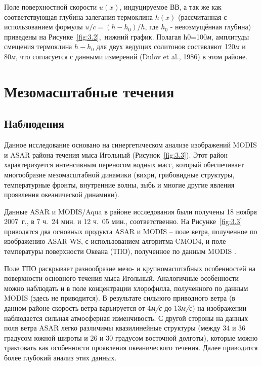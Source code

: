 Поле поверхностной скорости $u(x)$, индуцируемое ВВ, а так же как соответствующая глубина залегания термоклина $h(x)$ (рассчитанная с использованием формулы $u/c=(h-h_{0} )/h$, где $h_{0} $ - невозмущённая глубина) приведены на Рисунке~\ref{fig:3.2},~нижний график. Полагая h0=100\textit{м}, амплитуды смещения термоклина $h-h_{0} $ для двух ведущих солитонов составляют 120\textit{м} и 80\textit{м}, что согласуется с данными измерений (Dulov et al., 1986) в этом районе.



\section{Мезомасштабные течения} \label{sec:3.2}



\subsection{Наблюдения} \label{sec:3.2.1}


Данное исследование основано на синергетическом анализе изображений MODIS и ASAR района течения мыса Игольный (Рисунок~\ref{fig:3.3}). Этот район характеризуется интенсивным переносом водных масс, который обеспечивает многообразие мезомасштабной динамики (вихри, грибовидные структуры, температурные фронты, внутренние волны, зыбь и многие другие явления проявления океанической динамики).

Данные ASAR и MODIS/Aqua в районе исследования были получены 18 ноября 2007~г., в 7 ч.~24 мин. и 12 ч.~05 мин., соответственно. На Рисунке~\ref{fig:3.3} приводятся два основных продукта ASAR и MODIS -- поле ветра, полученное по изображению ASAR WS, с использованием алгоритма CMOD4, и поле температуры поверхности Океана (ТПО), полученное по данным MODIS \citep{Brown1999}.

Поле ТПО раскрывает разнообразие мезо- и крупномасштабных особенностей на поверхности основного течения мыса Игольный. Аналогичные особенности можно наблюдать и в поле концентрации хлорофилла, полученного по данным MODIS (здесь не приводится). В результате сильного приводного ветра (в данном районе скорость ветра варьируется от 4\textit{м/с} до 13\textit{м/с}) на изображении наблюдается сильная атмосферная изменчивость. С другой стороны на данных поля ветра ASAR легко различимы квазилинейные структуры (между 34 и 36 градусом южной широты и 26 и 30 градусом восточной долготы), которые можно трактовать как особенности проявления океанического течения. Далее приводится более глубокий анализ этих данных.

